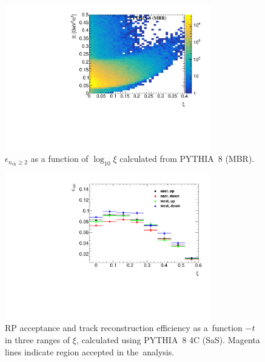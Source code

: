\begin{figure}[h!]
	\centering
	\includegraphics[width=0.8\textwidth, page=17]{chapters/dataSampleSTAR/img/true.pdf}
	\caption{$\epsilon_{ n_\textrm{ch} \geq 2}$ as a function of $\log_{10}\xi$ calculated from PYTHIA~8 (MBR).}
	\label{fig:STARtrueMCfiducial}
\end{figure}

\begin{figure}[h!]
	\centering
	\includegraphics[width=0.8\textwidth, page=4]{chapters/dataSampleSTAR/img/rpeffi.pdf}
	\caption{RP acceptance and track reconstruction efficiency as a~function $-t$ in three ranges of $\xi$, calculated using PYTHIA~8 4C (SaS). Magenta lines indicate region accepted in the~analysis.}
	\label{fig:STARAcceptance}
\end{figure}

\FloatBarrier